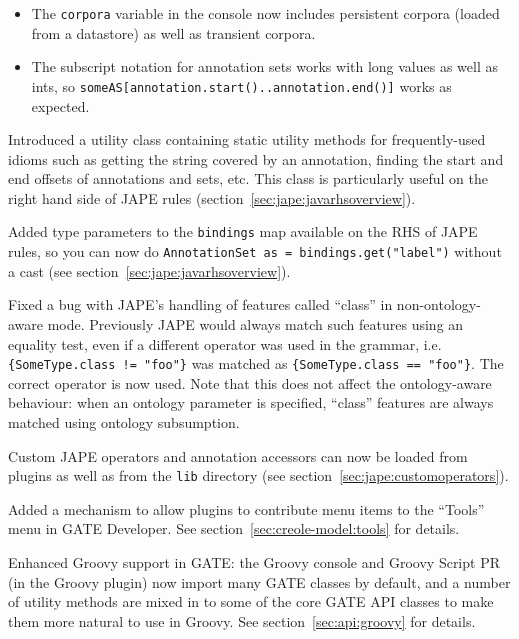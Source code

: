 \begin{itemize}
\item The {\tt corpora} variable in the console now includes persistent corpora
  (loaded from a datastore) as well as transient corpora.
\item The subscript notation for annotation sets works with long values as well
  as ints, so \verb|someAS[annotation.start()..annotation.end()]| works as
  expected.
\end{itemize}



Introduced a utility class
containing static utility methods for frequently-used idioms such as getting
the string covered by an annotation, finding the start and end offsets of
annotations and sets, etc.  This class is particularly useful on the right hand
side of JAPE rules (section~\ref{sec:jape:javarhsoverview}).

Added type parameters to the \verb|bindings| map available on the RHS of JAPE
rules, so you can now do \verb|AnnotationSet as = bindings.get("label")|
without a cast (see section~\ref{sec:jape:javarhsoverview}).

Fixed a bug with JAPE's handling of features called ``class'' in
non-ontology-aware mode.  Previously JAPE would always match such features
using an equality test, even if a different operator was used in the grammar,
i.e. \verb|{SomeType.class != "foo"}| was matched as
\verb|{SomeType.class == "foo"}|.  The correct operator is now used.  Note that
this does not affect the ontology-aware behaviour: when an ontology parameter
is specified, ``class'' features are always matched using ontology subsumption.

Custom JAPE operators and annotation accessors can now be loaded from plugins
as well as from the \texttt{lib} directory (see
section~\ref{sec:jape:customoperators}).


Added a mechanism to allow plugins to contribute menu items to the ``Tools''
menu in GATE Developer.  See section~\ref{sec:creole-model:tools} for details.

Enhanced Groovy support in GATE: the Groovy console and Groovy Script PR (in
the Groovy plugin) now import many GATE classes by default, and a number of
utility methods are mixed in to some of the core GATE API classes to make them
more natural to use in Groovy.  See section~\ref{sec:api:groovy} for details.

